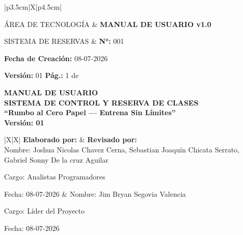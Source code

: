 \documentclass[11pt,a4paper]{article}
\begin{document}
\thispagestyle{empty} %

\begin{tabularx}{\linewidth}{|p{3.5cm}|X|p{4.5cm}|}
  \hline
  \centering {} \par \fontsize{7pt}{8pt}\selectfont ÁREA DE TECNOLOGÍA & 
  \centering \bfseries MANUAL DE USUARIO v1.0 \par SISTEMA DE RESERVAS & 
  \fontsize{8pt}{9pt}\selectfont 
  \textbf{N°:} 001 \par 
  \textbf{Fecha de Creación:} 08-07-2026 \par 
  \textbf{Versión:} 01 \hfill \textbf{Pág.:} 1 de \pageref{LastPage} \\
  \hline
\end{tabularx}

\vspace{2.5cm}

\begin{center}
  {\fontsize{32pt}{38pt}\selectfont \textbf{MANUAL DE USUARIO}} \\[0.5cm]
  {\fontsize{18pt}{22pt}\selectfont \textbf{\color{brandgray}SISTEMA DE CONTROL Y RESERVA DE CLASES}} \\[1cm]
  {\fontsize{14pt}{16pt}\selectfont \textbf{\color{brandorange}``Rumbo al Cero Papel — Entrena Sin Límites''}} \\[1.5cm]
  {\large \textbf{Versión: 01}}
\end{center}

\vspace{2.5cm}

\noindent
\begin{tabularx}{\linewidth}{|X|X|}
  \hline
  \textbf{Elaborado por:} & \textbf{Revisado por:} \\
  \hline
  Nombre: Joshua Nicolas Chavez Cerna, Sebastian Joaquín Chicata Serrato, Gabriel Sonny De la cruz Aguilar \par
  Cargo: Analistas Programadores \par
  Fecha: 08-07-2026 &
  Nombre: Jim Bryan Segovia Valencia \par
  Cargo: Líder del Proyecto \par
  Fecha: 08-07-2026 \\
  \hline
   \\
  \hline
   \\
  \hline
\end{tabularx}
\end{document}
